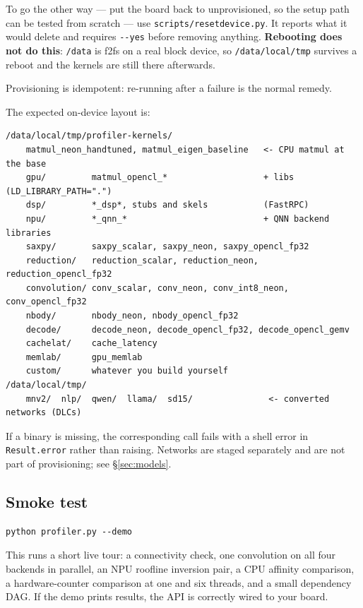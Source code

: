 \documentclass[11pt,a4paper]{article}
\newcommand{\code}[1]{\texttt{\let\_\breakableunderscore #1}}
\newcommand{\breakableunderscore}{\textunderscore\allowbreak}
\begin{document}
\noindent To go the other way --- put the board back to unprovisioned, so
the setup path can be tested from scratch --- use \code{scripts/reset\_device.py}.
It reports what it would delete and requires \code{-{}-yes} before
removing anything. \textbf{Rebooting does not do this}: \code{/data} is f2fs
on a real block device, so \code{/data/local/tmp} survives a reboot and
the kernels are still there afterwards.

\noindent Provisioning is idempotent: re-running after a failure is the
normal remedy.

\noindent The expected on-device layout is:

\begin{lstlisting}[style=plain]
/data/local/tmp/profiler-kernels/
    matmul_neon_handtuned, matmul_eigen_baseline   <- CPU matmul at the base
    gpu/         matmul_opencl_*                   + libs (LD_LIBRARY_PATH=".")
    dsp/         *_dsp*, stubs and skels           (FastRPC)
    npu/         *_qnn_*                           + QNN backend libraries
    saxpy/       saxpy_scalar, saxpy_neon, saxpy_opencl_fp32
    reduction/   reduction_scalar, reduction_neon, reduction_opencl_fp32
    convolution/ conv_scalar, conv_neon, conv_int8_neon, conv_opencl_fp32
    nbody/       nbody_neon, nbody_opencl_fp32
    decode/      decode_neon, decode_opencl_fp32, decode_opencl_gemv
    cachelat/    cache_latency
    memlab/      gpu_memlab
    custom/      whatever you build yourself
/data/local/tmp/
    mnv2/  nlp/  qwen/  llama/  sd15/               <- converted networks (DLCs)
\end{lstlisting}

\noindent If a binary is missing, the corresponding call fails with a shell
error in \code{Result.error} rather than raising. Networks are staged
separately and are not part of provisioning; see \S\ref{sec:models}.

\subsection{Smoke test}

\begin{lstlisting}[style=sh]
python profiler.py --demo
\end{lstlisting}

\noindent This runs a short live tour: a connectivity check, one convolution on
all four backends in parallel, an NPU roofline inversion pair, a CPU affinity
comparison, a hardware-counter comparison at one and six threads, and a small
dependency DAG. If the demo prints results, the API is correctly wired to your
board.
\end{document}
